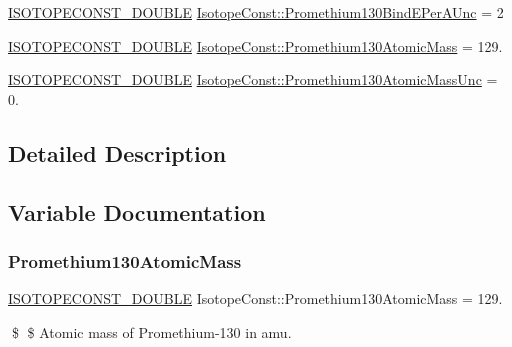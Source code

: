 \begin{DoxyCompactItemize}
\mbox{\hyperlink{group___isotope_const-_macros_ga8f45a7272ce02c0b4c65c44636ed719a}{I\+S\+O\+T\+O\+P\+E\+C\+O\+N\+S\+T\+\_\+\+D\+O\+U\+B\+LE}} \mbox{\hyperlink{group___isotope_const-_promethium-_pm130_ga28854a0b01f625b3bd45d77ca264ef06}{Isotope\+Const\+::\+Promethium130\+Bind\+E\+Per\+A\+Unc}} = 2
\item 
\mbox{\hyperlink{group___isotope_const-_macros_ga8f45a7272ce02c0b4c65c44636ed719a}{I\+S\+O\+T\+O\+P\+E\+C\+O\+N\+S\+T\+\_\+\+D\+O\+U\+B\+LE}} \mbox{\hyperlink{group___isotope_const-_promethium-_pm130_ga54dc609f97ecd7085651c8769e660104}{Isotope\+Const\+::\+Promethium130\+Atomic\+Mass}} = 129.
\item 
\mbox{\hyperlink{group___isotope_const-_macros_ga8f45a7272ce02c0b4c65c44636ed719a}{I\+S\+O\+T\+O\+P\+E\+C\+O\+N\+S\+T\+\_\+\+D\+O\+U\+B\+LE}} \mbox{\hyperlink{group___isotope_const-_promethium-_pm130_ga8dc661030290dd47f0bbd81e55de39f9}{Isotope\+Const\+::\+Promethium130\+Atomic\+Mass\+Unc}} = 0.
\end{DoxyCompactItemize}


\subsection{Detailed Description}


\subsection{Variable Documentation}
\mbox{\label{group___isotope_const-_promethium-_pm130_ga54dc609f97ecd7085651c8769e660104}} 
\subsubsection{\texorpdfstring{Promethium130\+Atomic\+Mass}{Promethium130AtomicMass}}
{\footnotesize\ttfamily \mbox{\hyperlink{group___isotope_const-_macros_ga8f45a7272ce02c0b4c65c44636ed719a}{I\+S\+O\+T\+O\+P\+E\+C\+O\+N\+S\+T\+\_\+\+D\+O\+U\+B\+LE}} Isotope\+Const\+::\+Promethium130\+Atomic\+Mass = 129.}

\$ \$ Atomic mass of Promethium-\/130 in amu. \mbox{\label{group___isotope_const-_promethium-_pm130_ga8dc661030290dd47f0bbd81e55de39f9}} 
